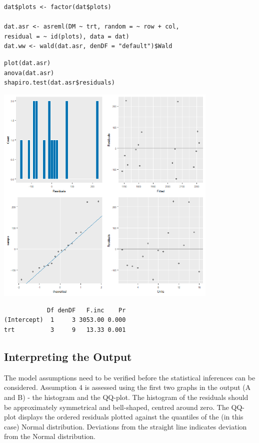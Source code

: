 \documentclass[a4paper, 10pt, fleqn, twosided]{memoir}
\begin{document}
\begin{tcolorbox}[title = Fitting the linear mixed model for a LS]
\begin{verbatim}
dat$plots <- factor(dat$plots)

dat.asr <- asreml(DM ~ trt, random = ~ row + col,
residual = ~ id(plots), data = dat)
dat.ww <- wald(dat.asr, denDF = "default")$Wald
\end{verbatim}

\tcblower
\begin{verbatim}
plot(dat.asr)
anova(dat.asr)
shapiro.test(dat.asr$residuals)
\end{verbatim}
\end{tcolorbox}
\clearpage {}
\begin{tcolorbox}[title = Example 4 Output]
\includegraphics[width=0.8\textwidth, frame]{Example4LMMResplot.png}
\begin{verbatim}
            Df denDF   F.inc    Pr
(Intercept)  1     3 3053.00 0.000
trt          3     9   13.33 0.001
\end{verbatim}
\end{tcolorbox}


\subsection{Interpreting the Output}

The model assumptions need to be verified before the statistical inferences can be considered. Assumption 4 is assessed
using the first two graphs in the output (A and B) - the histogram and the QQ-plot. The histogram of the residuals
should be approximately symmetrical and bell-shaped, centred around zero. The QQ-plot displays the ordered residuals
plotted against the quantiles of the (in this case) Normal distribution. Deviations from the straight line indicates
deviation from the Normal distribution.
\end{document}
